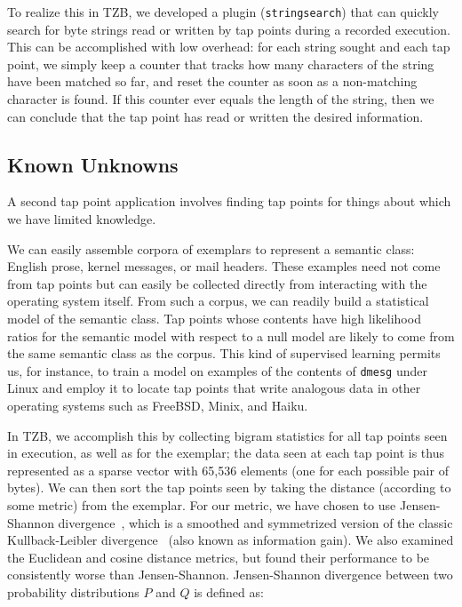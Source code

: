 To realize this in TZB, we developed a plugin (\texttt{stringsearch})
that can quickly search for byte strings read or written by tap points
during a recorded execution. This can be accomplished with low overhead:
for each string sought and each tap point, we simply keep a counter that
tracks how many characters of the string have been matched so far, and
reset the counter as soon as a non-matching character is found. If this
counter ever equals the length of the string, then we can conclude that
the tap point has read or written the desired information.

\subsection{Known Unknowns}
\label{sec:technical:subsec:knownunk}

A second tap point application involves finding tap points for things
about which we have limited knowledge.

We can easily assemble corpora of exemplars to represent a semantic
class: English prose, kernel messages, or mail headers. These examples
need not come from tap points but can easily be collected directly from
interacting with the operating system itself. From such a corpus, we can
readily build a statistical model of the semantic class. Tap points
whose contents have high likelihood ratios for the semantic model with
respect to a null model are likely to come from the same semantic class
as the corpus. This kind of supervised learning permits us, for
instance, to train a model on examples of the contents of \texttt{dmesg}
under Linux and employ it to locate tap points that write analogous data
in other operating systems such as FreeBSD, Minix, and Haiku.

In TZB, we accomplish this by collecting bigram statistics for all tap
points seen in execution, as well as for the exemplar; the data seen at
each tap point is thus represented as a sparse vector with 65,536
elements (one for each possible pair of bytes). We can then sort the tap
points seen by taking the distance (according to some metric) from the
exemplar. For our metric, we have chosen to use Jensen-Shannon
divergence~\cite{Lin:2006fk}, which is a smoothed and symmetrized
version of the classic Kullback-Leibler
divergence~\cite{Kullback:1951uq} (also known as information gain). We
also examined the Euclidean and cosine distance metrics, but found their
performance to be consistently worse than Jensen-Shannon. Jensen-Shannon
divergence between two probability distributions $P$ and $Q$ is defined
as:

